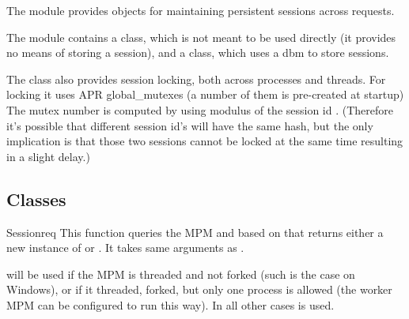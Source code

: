 The  module provides objects for maintaining persistent
sessions across requests.

The module contains a  class, which is not meant to
be used directly (it provides no means of storing a session), and a
 class, which uses a dbm to store sessions. 

The  class also provides session locking, both
across processes and threads. For locking it uses APR global_mutexes
(a number of them is pre-created at startup) The mutex number is
computed by using modulus of the session id
. (Therefore it's possible that different session
id's will have the same hash, but the only implication is that those
two sessions cannot be locked at the same time resulting in a slight
delay.)

\subsection{Classes\label{pyapi-sess-classes}}

\begin{funcdesc}{Session}{req}
  This function queries the MPM and based on that returns either a new
  instance of  or . It takes
  same arguments as .

   will be used if the MPM is threaded and not
  forked (such is the case on Windows), or if it threaded, forked, but
  only one process is allowed (the worker MPM can be configured to run
  this way). In all other cases  is used.
\end{funcdesc}


